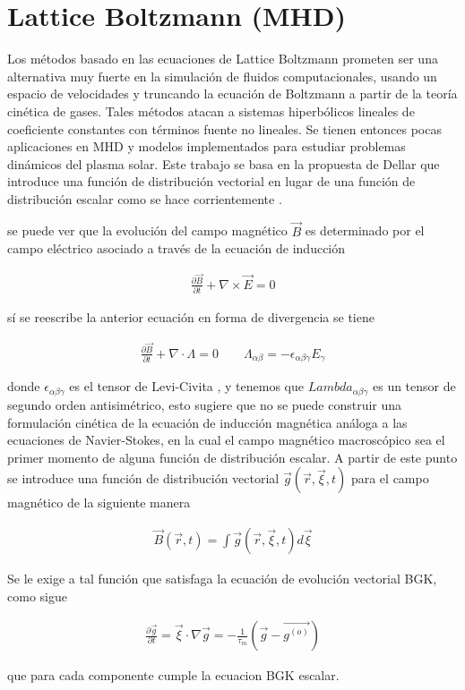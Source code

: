 \chapter{Lattice Boltzmann (MHD)}


\noindent Los métodos basado en las ecuaciones de Lattice Boltzmann prometen ser una alternativa muy fuerte en la simulación de fluidos computacionales, usando un espacio de velocidades y truncando la ecuación de Boltzmann a partir de la teoría cinética de gases. Tales métodos atacan a sistemas hiperbólicos lineales de coeficiente constantes con términos fuente no lineales. Se tienen entonces pocas aplicaciones en MHD y modelos implementados para estudiar problemas dinámicos del plasma solar. Este trabajo se basa en la propuesta de Dellar \cite{Dellar} que introduce una función de distribución vectorial en lugar de una función de distribución escalar como se hace corrientemente \cite{kruger}.  

\noindent se puede ver que la evolución del campo magnético $\vec{B}$ es determinado por el campo eléctrico asociado a través de la ecuación de inducción

\begin{eqnarray}
    \frac{\partial \vec{B}}{\partial t} + \nabla \times \vec{E} = 0 \nonumber 
\end{eqnarray}

\noindent sí se reescribe la anterior ecuación en forma de divergencia se tiene 

\begin{eqnarray}
    \frac{\partial \vec{B}}{\partial t} + \nabla\cdot\Lambda = 0 \qquad \Lambda_{\alpha\beta}=-\epsilon_{\alpha\beta\gamma}E_{\gamma}
\end{eqnarray}

donde $\epsilon_{\alpha\beta\gamma}$ es el tensor  de Levi-Civita , y tenemos que $Lambda_{\alpha\beta\gamma}$ es un tensor de segundo orden antisimétrico, esto sugiere que no se puede construir una formulación cinética de la ecuación de inducción magnética análoga a las ecuaciones de Navier-Stokes, en la cual el campo magnético macroscópico sea el primer momento de alguna función de distribución escalar. A partir de este punto se introduce una función de distribución vectorial $\vec{g}(\vec{r},\vec{\xi},t)$ para el campo magnético de la siguiente manera

\begin{eqnarray}
    \vec{B}(\vec{r},t) = \int \vec{g}(\vec{r},\vec{\xi},t)d\vec{\xi}
\end{eqnarray}

Se le exige a tal función que satisfaga la ecuación de evolución vectorial BGK, como sigue

\begin{eqnarray}
    \frac{\partial \vec{g}}{\partial t} = \vec{\xi}\cdot\nabla\vec{g} = -\frac{1}{\tau_{m}}(\vec{g}-\vec{g^{(o)}})
\end{eqnarray}

que para cada componente cumple la ecuacion BGK escalar. 
